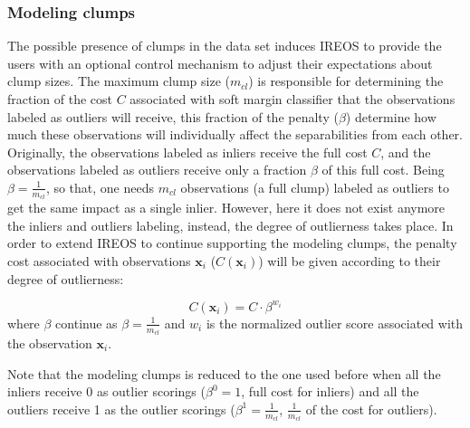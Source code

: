 \subsubsection{Modeling clumps}
The possible presence of clumps in the data set induces IREOS to provide the users with an optional control mechanism to adjust their expectations about clump sizes. The maximum clump size ($m_{cl}$) is responsible for determining the fraction of the cost $C$ associated with soft margin classifier that the observations labeled as outliers will receive, this fraction of the penalty ($\beta$) determine how much these observations will individually affect the separabilities from each other. Originally, the observations labeled as inliers receive the full cost $C$, and the observations labeled as outliers receive only a fraction $\beta$ of this full cost. Being $\beta = \frac{1}{m_{cl}}$, so that, one needs $m_{cl}$ observations (a full clump) labeled as outliers to get the same impact as a single inlier. However, here it does not exist anymore the inliers and outliers labeling, instead, the degree of outlierness takes place. In order to extend IREOS to continue supporting the modeling clumps, the penalty cost associated with observations $\mathbf{x}_i$ ($C(\mathbf{x}_i)$) will be given according to their degree of outlierness:

\begin{equation}
C(\mathbf{x}_i) = C \cdot \beta^{w_i}
\end{equation}
where $\beta$ continue as $\beta = \frac{1}{m_{cl}}$ and ${w_i}$ is the normalized outlier score associated with the observation $\mathbf{x}_i$. 

Note that the modeling clumps is reduced to the one used before when all the inliers receive 0 as outlier scorings ($\beta^0 = 1$, full cost for inliers) and all the outliers receive 1 as the outlier scorings ($\beta^1 = \frac{1}{m_{cl}}$, $\frac{1}{m_{cl}}$ of the cost for outliers).


